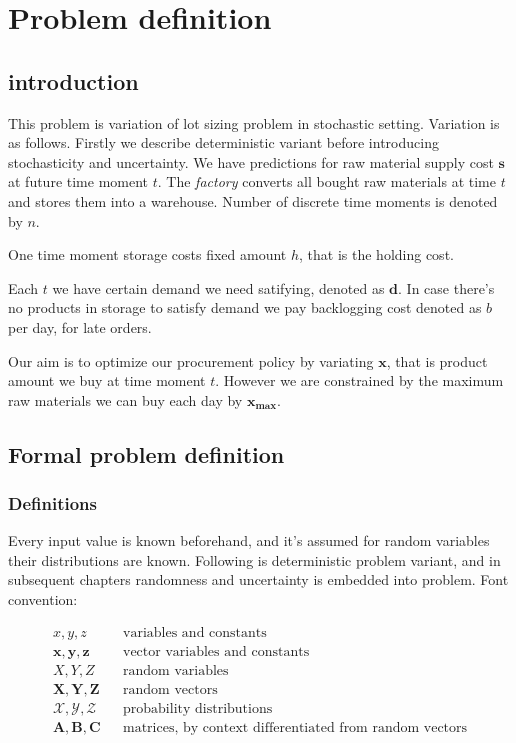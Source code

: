 
\chapter{Problem definition}
\label{chap:prob-def}
\section{introduction}

This problem is variation of lot sizing problem in stochastic setting. Variation is as follows. Firstly we describe deterministic variant before introducing stochasticity and uncertainty. We have predictions for raw material supply cost $\mathbf{s}$ at future time moment $t$. The \emph{factory} converts all bought raw materials at time $t$ and stores them into a warehouse. Number of discrete time moments is denoted by $n$.

One time moment storage costs fixed amount $h$, that is the holding cost.

Each $t$ we have certain demand we need satifying, denoted as $\mathbf{d}$. In case there's no products in storage to satisfy demand we pay backlogging cost denoted as $b$ per day, for late orders.

Our aim is to optimize our procurement policy by variating $\mathbf{x}$, that is product amount we buy at time moment $t$. However we are constrained by the maximum raw materials we can buy each day by $\mathbf{x_{\text{max}}}$.

\section{Formal problem definition}
\label{sec:Formal problem definition}

\subsection{Definitions}
\label{sub:Definitions}

Every input value is known beforehand, and it's assumed for random variables their distributions are known. Following is deterministic problem variant, and in subsequent chapters randomness and uncertainty is embedded into problem. Font convention:

\begin{align*}
x, y, z && \text{variables and constants} \\
\mathbf{x, y, z} && \text{vector variables and constants} \\
X, Y, Z && \text{random variables} \\
\mathbf{X, Y, Z} && \text{random vectors} \\
\mathcal{X, Y, Z} && \text{probability distributions} \\
\mathbf{A, B, C} && \text{matrices, by context differentiated from random vectors}
\end{align*}

